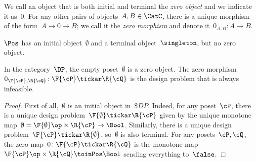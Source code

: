 \begin{comment}
\begin{table}[b]
\resizebox{\textwidth}{!}{
\begin{tabular}{ccccccccccc}
    category &
    objects & morphisms &
    product (ob) & product (morph) & coproduct (ob) & coproduct (morph) & biproduct (morph) & tensor product &
    initial  & terminal\\
    \hline

    $\Set$ &
    sets & functions &
    Cartesian product & (not used) & disjoint union & (not used) &
    none & $\times$ \emph{or} $\sqcup$ &
    $\emptyset$ & $\{\ast\}$ \\

    $\Cat{Pos}$ &
    posets & monotone maps &
    Cartesian product & (not used) & disjoint union & (not used) &
    none & $\times$ &
    $\emptyset$  & $\{\ast\}$\\

    $\DP$ &
    posets & design problems &
    disjoint union & $\times_\DP$ & disjoint union & $\sqcup_\DP$  &
    disjoint union & $\times$ &
    $\emptyset$ & $\{\ast\}$\\

\end{tabular}}
\caption{A comparison of $\Pos, \Set$, and $\DP$.}
\end{table}
\end{comment}

\begin{ctdefinition}
We call an object that is both initial and terminal the \emph{zero object} and we indicate it as~$0$. For any other pairs of objects~$A, B\in\CatC$, there is a unique morphism of the form~$A \to 0\to B$; we call it the \emph{zero morphism} and denote it~$0_{A,B}\colon A \to B$.
\end{ctdefinition}

\begin{example}
$\Pos$ has an initial object~$\emptyset$ and a terminal object~$\singleton$, but no zero object.
\end{example}

\begin{lemma}
In the category~$\DP$, the empty poset~$\emptyset$ is a zero object. The zero morphism~$0_{\F{\cP},\R{\cQ}}\colon \F{\cP} \tickar \R{\cQ}$ is the design problem that is always infeasible.
\end{lemma}
\begin{proof}
    First of all,~$\emptyset$ is an initial object in~$\$DP$. Indeed, for any poset~$\cP $, there is a unique design problem~$\F{\emptyset} \tickar \R{\cP}$ given by the unique monotone map~$\emptyset=\F{\emptyset}\op\times \R{\cP} \to\Bool$. Similarly, there is a unique design problem~$\F{\cP} \tickar \R{\emptyset}$, so~$\emptyset$ is also terminal. For any posets~$\cP ,\cQ$, the zero map~$0 \colon \F{\cP} \tickar \R{\cQ}$ is the monotone map~$\F{\cP} \op\times \R{\cQ} \toinPos \Bool$ sending everything to~$\false$.
\end{proof}


